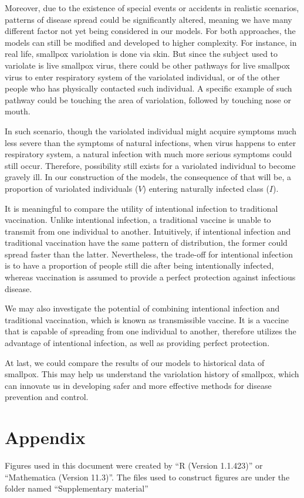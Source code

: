 \documentclass[12pt]{article}
\begin{document}
Moreover, due to the existence of special events or accidents in realistic scenarios, patterns of disease spread could be significantly altered, meaning we have many different factor not yet being considered in our models. For both approaches, the models can still be modified and developed to higher complexity. For instance, in real life, smallpox variolation is done via skin. But since the subject used to variolate is live smallpox virus, there could be other pathways for live smallpox virus to enter respiratory system of the variolated individual, or of the other people who has physically contacted such individual. A specific example of such pathway could be touching the area of variolation, followed by touching nose or mouth. 

In such scenario, though the variolated individual might acquire symptoms much less severe than the symptoms of natural infections, when virus happens to enter respiratory system, a natural infection with much more serious symptoms could still occur. Therefore, possibility still exists for a variolated individual to become gravely ill. In our construction of the models, the consequence of that will be, a proportion of variolated individuals ($V$) entering naturally infected class ($I$).

It is meaningful to compare the utility of intentional infection to traditional vaccination. Unlike intentional infection, a traditional vaccine is unable to transmit from one individual to another. Intuitively, if intentional infection and traditional vaccination have the same pattern of distribution, the former could spread faster than the latter. Nevertheless, the trade-off for intentional infection is to have a proportion of people still die after being intentionally infected, whereas vaccination is assumed to provide a perfect protection against infectious disease.

We may also investigate the potential of combining intentional infection and traditional vaccination, which is known as transmissible vaccine. It is a vaccine that is capable of spreading from one individual to another, therefore utilizes the advantage of intentional infection, as well as providing perfect protection.

At last, we could compare the results of our models to historical data of smallpox. This may help us understand the variolation history of smallpox, which can innovate us in developing safer and more effective methods for disease prevention and control.

\section{Appendix}

Figures used in this document were created by ``R (Version 1.1.423)'' or ``Mathematica (Version 11.3)''. The files used to construct figures are under the folder named ``Supplementary material''

\printbibliography
\end{document}
